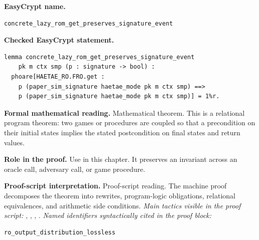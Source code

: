 \begin{formaltheorem}
\noindent\textbf{EasyCrypt name.}
\begin{lstlisting}[language=EasyCrypt,basicstyle=\ttfamily\scriptsize]
concrete_lazy_rom_get_preserves_signature_event
\end{lstlisting}
\noindent\textbf{Checked EasyCrypt statement.}
\begin{lstlisting}[language=EasyCrypt,basicstyle=\ttfamily\scriptsize]
lemma concrete_lazy_rom_get_preserves_signature_event
    pk m ctx smp (p : signature -> bool) :
  phoare[HAETAE_RO.FRO.get :
    p (paper_sim_signature haetae_mode pk m ctx smp) ==>
    p (paper_sim_signature haetae_mode pk m ctx smp)] = 1%r.
\end{lstlisting}
\noindent\textbf{Formal mathematical reading.}
Mathematical theorem. This is a relational program theorem: two games or procedures are coupled so that a precondition on their initial states implies the stated postcondition on final states and return values.

\noindent\textbf{Role in the proof.}
Use in this chapter. It preserves an invariant across an oracle call, adversary call, or game procedure.

\noindent\textbf{Proof-script interpretation.}
Proof-script reading. The machine proof decomposes the theorem into rewrites, program-logic obligations, relational equivalences, and arithmetic side conditions.
\emph{Main tactics visible in the proof script:} , , , .
\emph{Named identifiers syntactically cited in the proof block:}
\begin{lstlisting}[language=EasyCrypt,basicstyle=\ttfamily\scriptsize]
ro_output_distribution_lossless
\end{lstlisting}

\end{formaltheorem}

